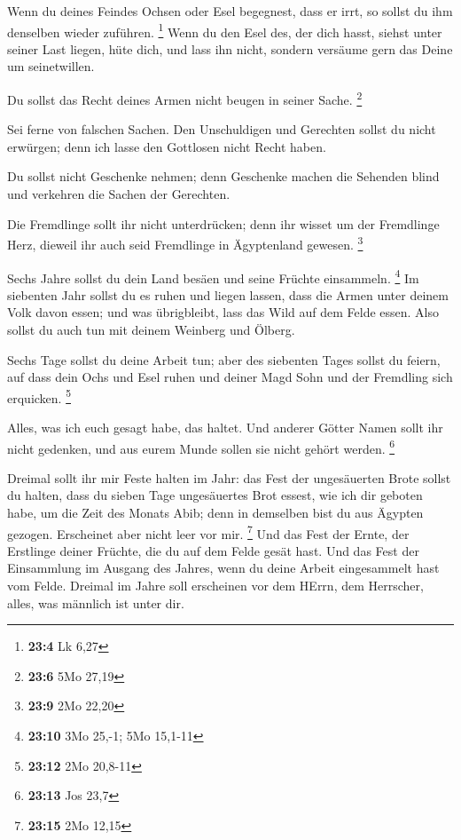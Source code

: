  Wenn du deines Feindes Ochsen oder Esel begegnest, dass er
irrt, so sollst du ihm denselben wieder zuführen. \footnote{\textbf{23:4}
  Lk 6,27}  Wenn du den Esel des, der dich hasst, siehst
unter seiner Last liegen, hüte dich, und lass ihn nicht, sondern
versäume gern das Deine um seinetwillen.

 Du sollst das Recht deines Armen nicht beugen in seiner
Sache. \footnote{\textbf{23:6} 5Mo 27,19}

 Sei ferne von falschen Sachen. Den Unschuldigen und
Gerechten sollst du nicht erwürgen; denn ich lasse den Gottlosen nicht
Recht haben.

 Du sollst nicht Geschenke nehmen; denn Geschenke machen die
Sehenden blind und verkehren die Sachen der Gerechten.

 Die Fremdlinge sollt ihr nicht unterdrücken; denn ihr
wisset um der Fremdlinge Herz, dieweil ihr auch seid Fremdlinge in
Ägyptenland gewesen. \footnote{\textbf{23:9} 2Mo 22,20}

 Sechs Jahre sollst du dein Land besäen und seine Früchte
einsammeln. \footnote{\textbf{23:10} 3Mo 25,-1; 5Mo 15,1-11}
 Im siebenten Jahr sollst du es ruhen und liegen lassen,
dass die Armen unter deinem Volk davon essen; und was übrigbleibt, lass
das Wild auf dem Felde essen. Also sollst du auch tun mit deinem
Weinberg und Ölberg.

 Sechs Tage sollst du deine Arbeit tun; aber des siebenten
Tages sollst du feiern, auf dass dein Ochs und Esel ruhen und deiner
Magd Sohn und der Fremdling sich erquicken. \footnote{\textbf{23:12} 2Mo
  20,8-11}

 Alles, was ich euch gesagt habe, das haltet. Und anderer
Götter Namen sollt ihr nicht gedenken, und aus eurem Munde sollen sie
nicht gehört werden. \footnote{\textbf{23:13} Jos 23,7}

 Dreimal sollt ihr mir Feste halten im Jahr: 
das Fest der ungesäuerten Brote sollst du halten, dass du sieben Tage
ungesäuertes Brot essest, wie ich dir geboten habe, um die Zeit des
Monats Abib; denn in demselben bist du aus Ägypten gezogen. Erscheinet
aber nicht leer vor mir. \footnote{\textbf{23:15} 2Mo 12,15}
 Und das Fest der Ernte, der Erstlinge deiner Früchte, die
du auf dem Felde gesät hast. Und das Fest der Einsammlung im Ausgang des
Jahres, wenn du deine Arbeit eingesammelt hast vom Felde. 
Dreimal im Jahre soll erscheinen vor dem HErrn, dem Herrscher, alles,
was männlich ist unter dir.


